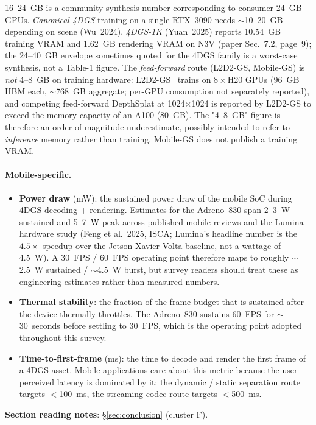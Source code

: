 \begin{itemize}
        16--24~GB is a community-synthesis number
        corresponding to consumer 24~GB GPUs.
        \emph{Canonical 4DGS} training on a single
        RTX~3090 needs $\sim$10--20~GB depending on scene
        (Wu~2024). \emph{4DGS-1K} (Yuan~2025) reports
        10.54~GB training VRAM and 1.62~GB rendering
        VRAM on N3V (paper Sec.~7.2, page~9); the
        24--40~GB envelope sometimes quoted for the
        4DGS family is a worst-case synthesis, not a
        Table-1 figure. The \emph{feed-forward} route
        (L2D2-GS, Mobile-GS) is \emph{not} 4--8~GB on
        training hardware: L2D2-GS~\cite{song2026l2d2gs}
        trains on $8\times$H20 GPUs (96~GB HBM each,
        $\sim$768~GB aggregate; per-GPU consumption not
        separately reported), and competing feed-forward
        DepthSplat at 1024$\times$1024 is reported by
        L2D2-GS to exceed the memory capacity of an
        A100 (80~GB). The "4--8~GB" figure is therefore
        an order-of-magnitude underestimate, possibly
        intended to refer to \emph{inference} memory
        rather than training. Mobile-GS does not publish
        a training VRAM.
\end{itemize}

\paragraph{Mobile-specific.}
\begin{itemize}
  \item \textbf{Power draw} (mW): the sustained power draw
        of the mobile SoC during 4DGS decoding + rendering.
        Estimates for the Adreno~830 span 2--3~W sustained
        and 5--7~W peak across published mobile reviews and
        the Lumina hardware study (Feng et al.\ 2025,
        ISCA; Lumina's headline number is the
        $4.5\times$ speedup over the Jetson Xavier Volta
        baseline, not a wattage of 4.5~W). A 30~FPS / 60~FPS
        operating point therefore maps to roughly
        $\sim$2.5~W sustained / $\sim$4.5~W burst, but
        survey readers should treat these as engineering
        estimates rather than measured numbers.
  \item \textbf{Thermal stability}: the fraction of the
        frame budget that is sustained after the device
        thermally throttles. The Adreno~830 sustains
        60~FPS for $\sim$30~seconds before settling to
        30~FPS, which is the operating point adopted
        throughout this survey.
  \item \textbf{Time-to-first-frame} (ms): the time to
        decode and render the first frame of a 4DGS
        asset. Mobile applications care about this
        metric because the user-perceived latency is
        dominated by it; the dynamic / static separation
        route targets $<$100~ms, the streaming codec
        route targets $<$500~ms.
\end{itemize}

\bigskip
\noindent\textbf{Section reading notes}:
\S\ref{sec:conclusion} (cluster F).
